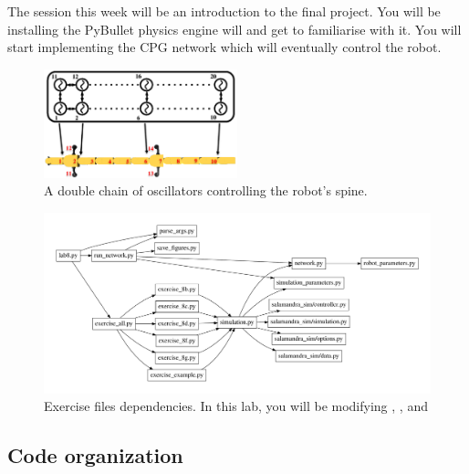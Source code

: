 \documentclass{cmc}
\begin{document}
 The session this week will be an introduction to the
final project. You will be installing the PyBullet physics engine will and get
to familiarise with it. You will start implementing the CPG network which will
eventually control the robot.

\begin{figure}[h]
  \centering
  \includegraphics[width=0.5\textwidth]{figures/model_controller.png}
  \caption[Controller model]{A double chain of oscillators controlling
    the robot’s spine.}
  \label{fig:controller-model}
\end{figure}

\begin{figure}[ht]
  \centering \includegraphics[width=1.0\textwidth]{figures/files}
  \caption{\label{fig:files} Exercise files dependencies. In this lab, you will
    be modifying , ,
     and }
\end{figure}


\subsection*{Code organization}
\label{subsec:code}
\end{document}
